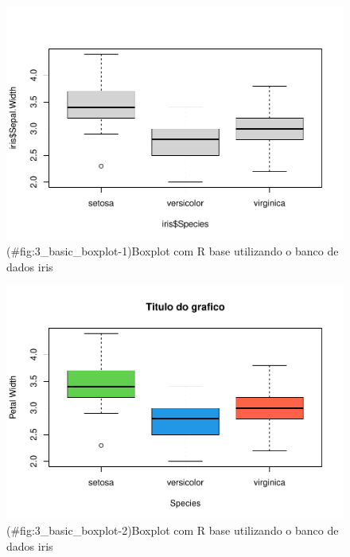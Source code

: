 \documentclass[
]{book}
\newenvironment{Shaded}{\begin{snugshade}}{\end{snugshade}}
\newcommand{\AttributeTok}[1]{\textcolor[rgb]{0.13,0.29,0.53}{#1}}
\newcommand{\CommentTok}[1]{\textcolor[rgb]{0.56,0.35,0.01}{\textit{#1}}}
\newcommand{\DecValTok}[1]{\textcolor[rgb]{0.00,0.00,0.81}{#1}}
\newcommand{\FunctionTok}[1]{\textcolor[rgb]{0.13,0.29,0.53}{\textbf{#1}}}
\newcommand{\NormalTok}[1]{#1}
\newcommand{\SpecialCharTok}[1]{\textcolor[rgb]{0.81,0.36,0.00}{\textbf{#1}}}
\newcommand{\StringTok}[1]{\textcolor[rgb]{0.31,0.60,0.02}{#1}}
\begin{document}
\begin{figure}
\centering
\includegraphics{_main_files/figure-latex/3_basic_boxplot-1.pdf}
\caption{(\#fig:3\_basic\_boxplot-1)Boxplot com R base utilizando o banco de dados iris}
\end{figure}

\begin{Shaded}
\end{Shaded}

\begin{figure}
\centering
\includegraphics{_main_files/figure-latex/3_basic_boxplot-2.pdf}
\caption{(\#fig:3\_basic\_boxplot-2)Boxplot com R base utilizando o banco de dados iris}
\end{figure}
\end{document}

